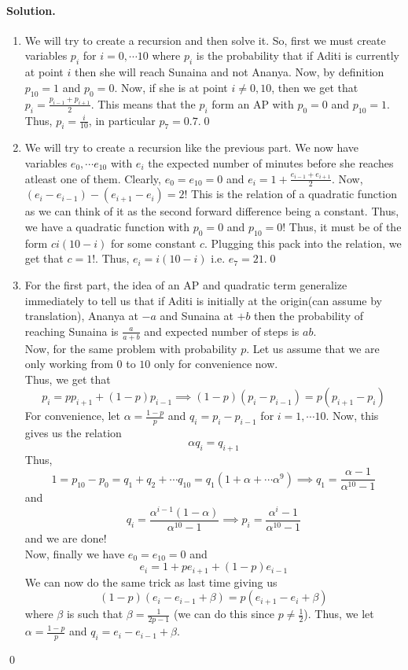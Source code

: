 \documentclass[12pt]{article}
\newenvironment{solution}
{\paragraph{Solution.}}
{\qed\eject}
\begin{document}
\begin{solution}
\begin{enumerate}
    \item We will try to create a recursion and then solve it. So, first we must create variables $p_i$ for $i=0,\cdots 10$ where $p_i$ is the probability that if Aditi is currently at point $i$ then she will reach Sunaina and not Ananya. Now, by definition $p_{10}=1$ and $p_0=0$. Now, if she is at point $i\ne 0,10$, then we get that $p_{i}=\frac{p_{i-1}+p_{i+1}}{2}$. This means that the $p_i$ form an AP with $p_0=0$ and $p_{10}=1$. Thus, $p_i=\frac{i}{10}$, in particular $p_7=0.7$.\qed 
    \item We will try to create a recursion like the previous part. We now have variables $e_0,\cdots e_{10}$ with $e_i$ the expected number of minutes before she reaches atleast one of them. Clearly, $e_0=e_{10}=0$ and $e_i=1+\frac{e_{i-1}+e_{i+1}}{2}$. Now, $(e_{i}-e_{i-1})-(e_{i+1}-e_i)=2$! This is the relation of a quadratic function as we can think of it as the second forward difference being a constant. Thus, we have a quadratic function with $p_0=0$ and $p_{10}=0$! Thus, it must be of the form $ci(10-i)$ for some constant $c$. Plugging this pack into the relation, we get that $c=1$!. Thus, $e_i=i(10-i)$ i.e. $e_7=21$.\qed
    \item For the first part, the idea of an AP and quadratic term generalize immediately to tell us that if Aditi is initially at the origin(can assume by translation), Ananya at $-a$ and Sunaina at $+b$ then the probability of reaching Sunaina is $\frac{a}{a+b}$ and expected number of steps is $ab$.\\
    
    Now, for the same problem with probability $p$. Let us assume that we are only working from $0$ to $10$ only for convenience now.\\

    Thus, we get that \[p_i=pp_{i+1}+(1-p)p_{i-1}\implies (1-p)(p_{i}-p_{i-1})=p(p_{i+1}-p_i)\]
    For convenience, let $\alpha=\frac{1-p}{p}$ and $q_i=p_i-p_{i-1}$ for $i=1,\cdots 10$. Now, this gives us the relation
    \[\alpha q_i=q_{i+1}\]
    Thus, \[1=p_10-p_0=q_1+q_2+\cdots q_{10}=q_1(1+\alpha+\cdots \alpha^9)\implies q_1=\frac{\alpha-1}{\alpha^{10}-1}\]
    and \[q_i=\frac{\alpha^{i-1}(1-\alpha)}{\alpha^{10}-1}\implies p_i=\frac{\alpha^i-1}{\alpha^{10}-1}\]
    and we are done!\\

    Now, finally we have $e_0=e_{10}=0$ and \[e_i=1+pe_{i+1}+(1-p)e_{i-1}\]
    We can now do the same trick as last time giving us \[(1-p)(e_i-e_{i-1}+\beta)=p(e_{i+1}-e_i+\beta)\]
    where $\beta$ is such that $\beta=\frac{1}{2p-1}$ (we can do this since $p\ne \frac{1}{2}$). Thus, we let $\alpha=\frac{1-p}{p}$ and $q_i=e_i-e_{i-1}+\beta$.\\


\end{enumerate}
\end{solution}
\end{document}

